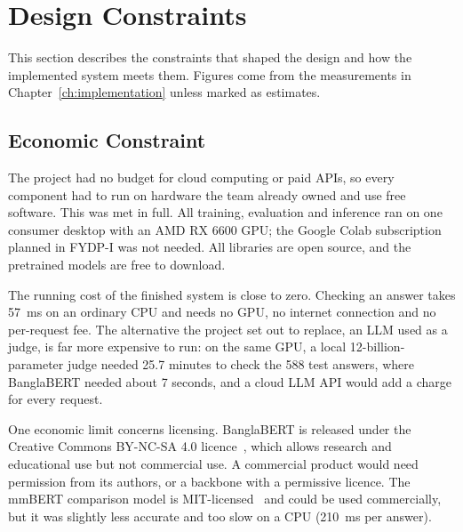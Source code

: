 %

\section{Design Constraints}
\label{sec:constraints}

This section describes the constraints that shaped the design and how the
implemented system meets them. Figures come from the measurements in
Chapter~\ref{ch:implementation} unless marked as estimates.

\subsection{Economic Constraint}

The project had no budget for cloud computing or paid APIs, so every component
had to run on hardware the team already owned and use free software. This was
met in full. All training, evaluation and inference ran on one consumer desktop
with an AMD RX 6600 GPU; the Google Colab subscription planned in FYDP-I was not
needed. All libraries are open source, and the pretrained models are free to
download.

The running cost of the finished system is close to zero. Checking an answer
takes 57~ms on an ordinary CPU and needs no GPU, no internet connection and no
per-request fee. The alternative the project set out to replace, an LLM used as
a judge, is far more expensive to run: on the same GPU, a local
12-billion-parameter judge needed 25.7 minutes to check the 588 test answers, where
BanglaBERT needed about 7 seconds, and a cloud LLM API would add a charge for
every request.

One economic limit concerns licensing. BanglaBERT is released under the Creative
Commons BY-NC-SA 4.0 licence~\cite{banglabert}, which allows research and
educational use but not commercial use. A commercial product would need
permission from its authors, or a backbone with a permissive licence. The mmBERT
comparison model is MIT-licensed~\cite{mmbert} and could be used commercially,
but it was slightly less accurate and too slow on a CPU (210~ms per answer).

